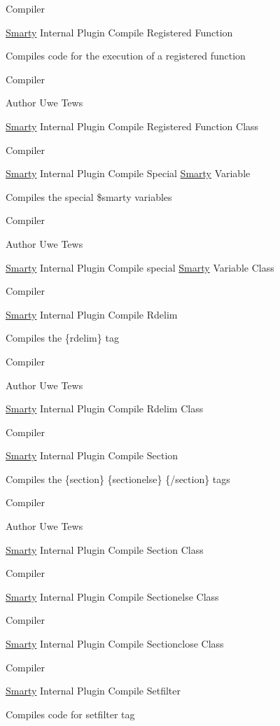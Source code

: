 Compiler

\hyperlink{class_smarty}{Smarty} Internal Plugin Compile Registered Function

Compiles code for the execution of a registered function

Compiler \begin{DoxyAuthor}{Author}
Uwe Tews
\end{DoxyAuthor}
\hyperlink{class_smarty}{Smarty} Internal Plugin Compile Registered Function Class

Compiler

\hyperlink{class_smarty}{Smarty} Internal Plugin Compile Special \hyperlink{class_smarty}{Smarty} Variable

Compiles the special \$smarty variables

Compiler \begin{DoxyAuthor}{Author}
Uwe Tews
\end{DoxyAuthor}
\hyperlink{class_smarty}{Smarty} Internal Plugin Compile special \hyperlink{class_smarty}{Smarty} Variable Class

Compiler

\hyperlink{class_smarty}{Smarty} Internal Plugin Compile Rdelim

Compiles the \{rdelim\} tag

Compiler \begin{DoxyAuthor}{Author}
Uwe Tews
\end{DoxyAuthor}
\hyperlink{class_smarty}{Smarty} Internal Plugin Compile Rdelim Class

Compiler

\hyperlink{class_smarty}{Smarty} Internal Plugin Compile Section

Compiles the \{section\} \{sectionelse\} \{/section\} tags

Compiler \begin{DoxyAuthor}{Author}
Uwe Tews
\end{DoxyAuthor}
\hyperlink{class_smarty}{Smarty} Internal Plugin Compile Section Class

Compiler

\hyperlink{class_smarty}{Smarty} Internal Plugin Compile Sectionelse Class

Compiler

\hyperlink{class_smarty}{Smarty} Internal Plugin Compile Sectionclose Class

Compiler

\hyperlink{class_smarty}{Smarty} Internal Plugin Compile Setfilter

Compiles code for setfilter tag

